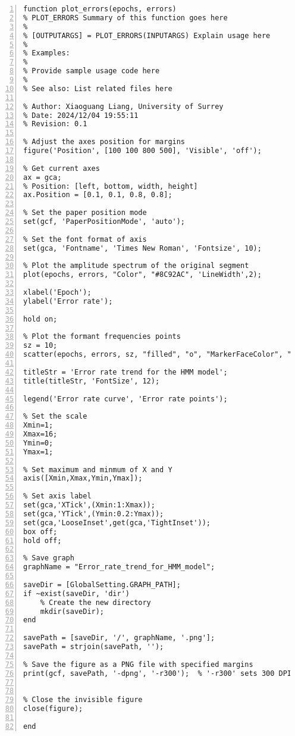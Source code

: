\documentclass{article}
\begin{document}
\begin{lstlisting}[frame=single, numbers=left, style=Matlab-editor, caption={plot\_errors.m}, label={lst:plot_errors}]
  function plot_errors(epochs, errors)
% PLOT_ERRORS Summary of this function goes here
%
% [OUTPUTARGS] = PLOT_ERRORS(INPUTARGS) Explain usage here
%
% Examples:
%
% Provide sample usage code here
%
% See also: List related files here

% Author: Xiaoguang Liang, University of Surrey
% Date: 2024/12/04 19:55:11
% Revision: 0.1

% Adjust the axes position for margins
figure('Position', [100 100 800 500], 'Visible', 'off');

% Get current axes
ax = gca;
% Position: [left, bottom, width, height]
ax.Position = [0.1, 0.1, 0.8, 0.8];

% Set the paper position mode
set(gcf, 'PaperPositionMode', 'auto');

% Set the font format of axis
set(gca, 'Fontname', 'Times New Roman', 'Fontsize', 10);

% Plot the amplitude spectrum of the original segment
plot(epochs, errors, "Color", "#8C92AC", 'LineWidth',2);

xlabel('Epoch');
ylabel('Error rate');

hold on;

% Plot the formant frequencies points
sz = 10;
scatter(epochs, errors, sz, "filled", "o", "MarkerFaceColor", "b");

titleStr = 'Error rate trend for the HMM model';
title(titleStr, 'FontSize', 12);

legend('Error rate curve', 'Error rate points');

% Set the scale
Xmin=1;
Xmax=16;
Ymin=0;
Ymax=1;

% Set maximum and minmum of X and Y
axis([Xmin,Xmax,Ymin,Ymax]);

% Set axis label 
set(gca,'XTick',(Xmin:1:Xmax));
set(gca,'YTick',(Ymin:0.2:Ymax));
set(gca,'LooseInset',get(gca,'TightInset'));
box off;
hold off;

% Save graph
graphName = "Error_rate_trend_for_HMM_model";

saveDir = [GlobalSetting.GRAPH_PATH];
if ~exist(saveDir, 'dir')
    % Create the new directory
    mkdir(saveDir);
end

savePath = [saveDir, '/', graphName, '.png'];
savePath = strjoin(savePath, '');

% Save the figure as a PNG file with specified margins
print(gcf, savePath, '-dpng', '-r300');  % '-r300' sets 300 DPI for high resolution


% Close the invisible figure
close(figure);

end

\end{lstlisting}
\end{document}
